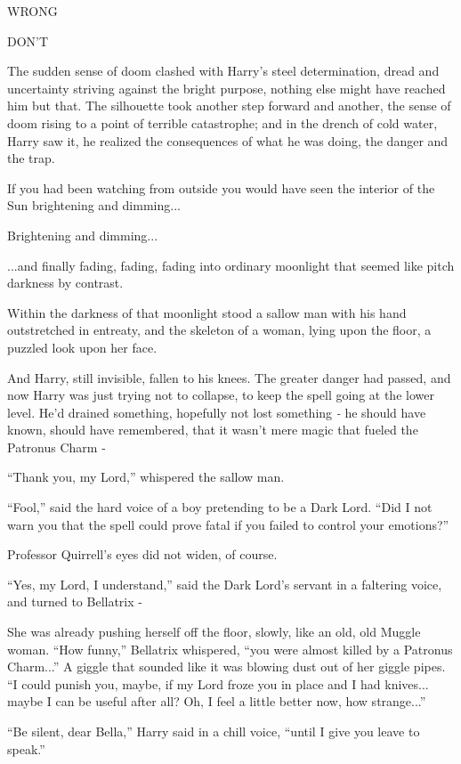 WRONG

DON'T

The sudden sense of doom clashed with Harry's steel determination, dread and uncertainty striving against the bright purpose, nothing else might have reached him but that. The silhouette took another step forward and another, the sense of doom rising to a point of terrible catastrophe; and in the drench of cold water, Harry saw it, he realized the consequences of what he was doing, the danger and the trap.

If you had been watching from outside you would have seen the interior of the Sun brightening and dimming...

Brightening and dimming...

...and finally fading, fading, fading into ordinary moonlight that seemed like pitch darkness by contrast.

Within the darkness of that moonlight stood a sallow man with his hand outstretched in entreaty, and the skeleton of a woman, lying upon the floor, a puzzled look upon her face.

And Harry, still invisible, fallen to his knees. The greater danger had passed, and now Harry was just trying not to collapse, to keep the spell going at the lower level. He'd drained something, hopefully not lost something \emph{-} he should have known, should have remembered, that it wasn't mere magic that fueled the Patronus Charm -

``Thank you, my Lord,'' whispered the sallow man.

``Fool,'' said the hard voice of a boy pretending to be a Dark Lord. ``Did I not warn you that the spell could prove fatal if you failed to control your emotions?''

Professor Quirrell's eyes did not widen, of course.

``Yes, my Lord, I understand,'' said the Dark Lord's servant in a faltering voice, and turned to Bellatrix -

She was already pushing herself off the floor, slowly, like an old, old Muggle woman. ``How funny,'' Bellatrix whispered, ``you were almost killed by a Patronus Charm...'' A giggle that sounded like it was blowing dust out of her giggle pipes. ``I could punish you, maybe, if my Lord froze you in place and I had knives... maybe I can be useful after all? Oh, I feel a little better now, how strange...''

``Be silent, dear Bella,'' Harry said in a chill voice, ``until I give you leave to speak.''

